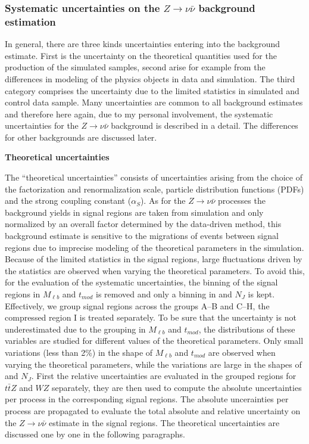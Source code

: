 \subsubsection{Systematic uncertainties on the $Z \to \nu \bar{\nu}$ background estimation}


In general, there are three kinds uncertainties entering into the background estimate. First is the uncertainty on the theoretical quantities used for the production of the simulated samples, second arise for example from the differences in modeling of the physics objects in data and simulation. The third category comprises the uncertainty due to the limited statistics in simulated and control data sample. Many uncertainties are common to all background estimates and therefore here again, due to my personal involvement, the systematic uncertainties for the $Z \to \nu \bar{\nu}$ background is described in a detail. The differences for other backgrounds are discussed later.

\textbf{Theoretical uncertainties}

The  ``theoretical uncertainties'' consists of uncertainties arising from the choice of the factorization and renormalization scale, particle distribution functions (PDFs) and the strong coupling constant ($\alpha_{S}$). As for the $Z \to \nu  \bar{\nu}$ processes the background yields in signal regions are taken from simulation and only normalized by an overall factor determined by the data-driven method, this background estimate is sensitive to the migrations of events between signal regions due to imprecise modeling of the theoretical parameters in the simulation. Because of the limited statistics in the signal regions, large fluctuations driven by the statistics are observed when varying the theoretical parameters. To avoid this, for the evaluation of the systematic uncertainties, the binning of the signal regions in $M_{\ell b}$ and $t_{mod}$ is removed and only a binning in \MET and $N_{J}$ is kept. Effectively, we group signal regions across the groups A--B and C--H, the compressed region I is treated separately. To be sure that the uncertainty is not underestimated due to the grouping in $M_{\ell b}$ and $t_{mod}$, the distributions of these variables are studied for different values of the theoretical parameters. Only small variations (less than 2\%) in the shape of $M_{\ell b}$ and $t_{mod}$ are observed when varying the theoretical parameters, while the variations are large in the shapes of \MET and $N_{J}$.  First the relative uncertainties are evaluated in the grouped regions for $t\bar{t}Z$ and $WZ$ separately, they are then used to compute the absolute uncertainties per process in the corresponding signal regions. The absolute uncerainties per process are propagated to evaluate the total absolute and relative uncertainty on the $Z \to \nu \bar{\nu}$ estimate in the signal regions.  The theoretical uncertainties are discussed one by one in the following paragraphs.



